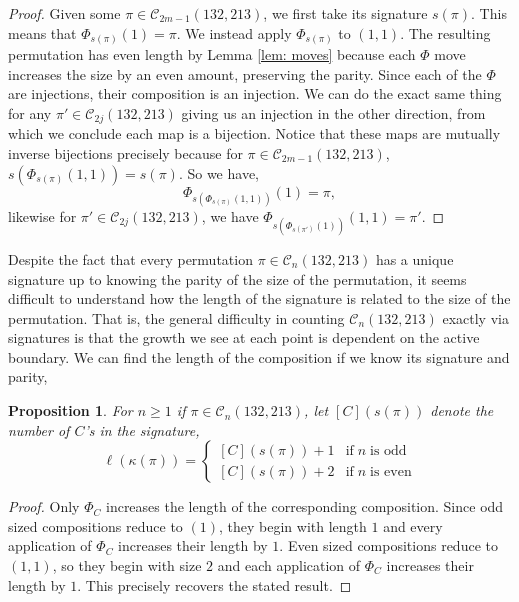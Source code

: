 \documentclass[11pt]{article}
\newcommand\C{\mathcal C}
\newtheorem{proposition}[theorem]{Proposition}
\theoremstyle{definition}
\begin{document}
 \begin{proof}
    Given some $\pi \in \C_{2m-1}(132,213)$, we first take its signature $s(\pi)$. This means that $\Phi_{s(\pi)}(1) = \pi$. We instead apply $\Phi_{s(\pi)}$ to $(1,1)$. The resulting permutation has even length by Lemma \ref{lem: moves} because each $\Phi$ move increases the size by an even amount, preserving the parity. Since each of the $\Phi$ are injections, their composition is an injection. We can do the exact same thing for any $\pi' \in \C_{2j}(132,213)$ giving us an injection in the other direction, from which we conclude each map is a bijection. Notice that these maps are mutually inverse bijections precisely because for $\pi \in \C_{2m-1}(132,213)$, $s(\Phi_{s(\pi)}(1,1)) = s(\pi)$. So we have,
    \[
    \Phi_{s(\Phi_{s(\pi)}(1,1))}(1) = \pi,
    \]
    likewise for $\pi' \in \C_{2j}(132,213)$, we have $\Phi_{s(\Phi_{s(\pi')}(1))}(1,1) = \pi'$.
 \end{proof}

  Despite the fact that every permutation $\pi \in \C_n(132,213)$ has a unique signature up to knowing the parity of the size of the permutation, it seems difficult to understand how the length of the signature is related to the size of the permutation. That is, the general difficulty in counting $\C_n(132,213)$ exactly via signatures is that the growth we see at each point is dependent on the active boundary. We can find the length of the composition if we know its signature and parity,

  \begin{proposition}
      For $n \ge 1$ if $\pi \in \C_n(132,213)$, let $[C](s(\pi))$ denote the number of $C$'s in the signature,
      \[
      \ell(\kappa(\pi)) = 
      \begin{cases}
          [C](s(\pi)) + 1 & \text{if} \; n \; \text{is odd}\\
          [C](s(\pi)) + 2 & \text{if} \; n \; \text{is even}
      \end{cases}
      \]
  \end{proposition}

  \begin{proof}
      Only $\Phi_C$ increases the length of the corresponding composition. Since odd sized compositions reduce to $(1)$, they begin with length $1$ and every application of $\Phi_C$ increases their length by $1$. Even sized compositions reduce to $(1,1)$, so they begin with size $2$ and each application of $\Phi_C$ increases their length by $1$. This precisely recovers the stated result.
  \end{proof}
\end{document}
